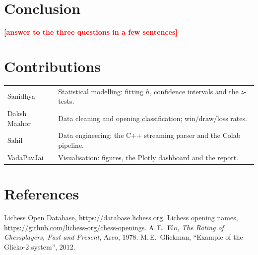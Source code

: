 \documentclass[11pt,a4paper]{article}
\newcommand{\TBD}[1]{\textcolor{red}{\textbf{[#1]}}}
\begin{document}
\FloatBarrier
\section{Conclusion}
\TBD{answer to the three questions in a few sentences}

\section*{Contributions}
\begin{tabularx}{\linewidth}{@{}lX@{}}
Sanidhya & Statistical modelling: fitting $h$, confidence intervals and the $z$-tests. \\
Daksh Maahor & Data cleaning and opening classification; win/draw/loss rates. \\
Sahil & Data engineering: the C++ streaming parser and the Colab pipeline. \\
VadaPavJai & Visualisation: figures, the Plotly dashboard and the report. \\
\end{tabularx}

\section*{References}
{\small
Lichess Open Database, \url{https://database.lichess.org}.
Lichess opening names, \url{https://github.com/lichess-org/chess-openings}.
A.\,E.~Elo, \emph{The Rating of Chessplayers, Past and Present}, Arco, 1978.
M.\,E.~Glickman, ``Example of the Glicko-2 system'', 2012.
}
\end{document}
